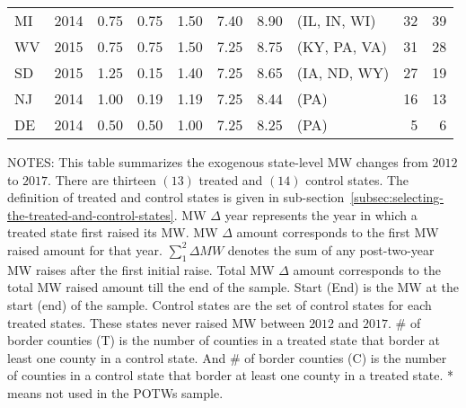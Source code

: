 \begin{table}[H]
{\begin{tabular}{lrrrrrrlrr}
            MI             & 2014             & 0.75               & 0.75                    & 1.50                     & 7.40     & 8.90   & (IL, IN, WI)   & 32                        & 39                        \\
            WV             & 2015             & 0.75               & 0.75                    & 1.50                     & 7.25     & 8.75   & (KY, PA, VA)   & 31                        & 28                        \\
            SD             & 2015             & 1.25               & 0.15                    & 1.40                     & 7.25     & 8.65   & (IA, ND, WY)   & 27                        & 19                        \\
            NJ             & 2014             & 1.00               & 0.19                    & 1.19                     & 7.25     & 8.44   & (PA)           & 16                        & 13                        \\
            DE             & 2014             & 0.50               & 0.50                    & 1.00                     & 7.25     & 8.25   & (PA)           & 5                         & 6                         \\ \bottomrule\bottomrule
        \end{tabular}
    }
    \begin{minipage}{17.5cm}
        \vspace{0.01in}
        \tiny NOTES: This table summarizes the exogenous state-level MW changes from $2012$ to $2017$. There are thirteen $(13)$ treated and $(14)$ control states. The definition of treated and control states is given in sub-section~\ref{subsec:selecting-the-treated-and-control-states}. MW $\Delta$ year represents the year in which a treated state first raised its MW. MW $\Delta$ amount corresponds to the first MW raised amount for that year. $\sum_{1}^{2}\Delta MW$ denotes the sum of any post-two-year MW raises after the first initial raise. Total MW $\Delta$ amount corresponds to the total MW raised amount till the end of the sample. Start (End) is the MW at the start (end) of the sample. Control states are the set of control states for each treated states. These states never raised MW between $2012$ and $2017$. \# of border counties (T) is the number of counties in a treated state that border at least one county in a control state. And \# of border counties (C) is the number of counties in a control state that border at least one county in a treated state. * means not used in the POTWs sample.
    \end{minipage}
\end{table}
